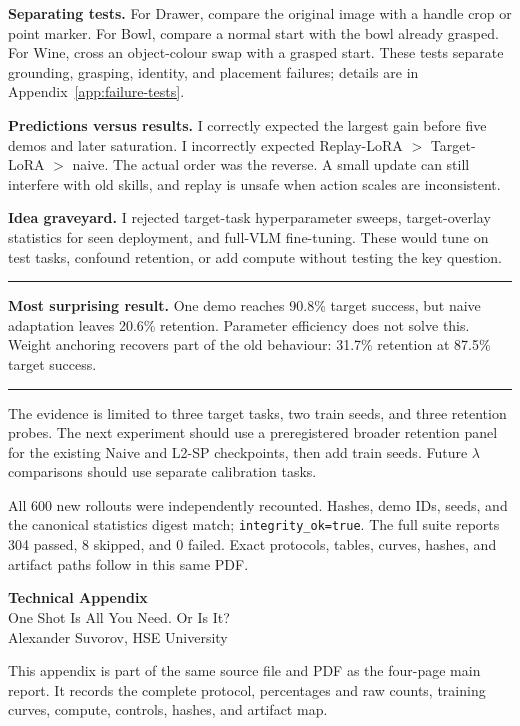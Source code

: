 \documentclass[10pt]{extarticle}
\newenvironment{finding}{\begin{center}\begin{minipage}{0.94\textwidth}\small\hrule\vspace{3pt}}{\vspace{3pt}\hrule\end{minipage}\end{center}}
\begin{document}
\textbf{Separating tests.}
For Drawer, compare the original image with a handle crop or point marker.
For Bowl, compare a normal start with the bowl already grasped. For Wine,
cross an object-colour swap with a grasped start. These tests separate
grounding, grasping, identity, and placement failures; details are in
Appendix~\ref{app:failure-tests}.

\textbf{Predictions versus results.}
I correctly expected the largest gain before five demos and later saturation.
I incorrectly expected Replay-LoRA \(>\) Target-LoRA \(>\) naive. The actual
order was the reverse. A small update can still interfere with old skills,
and replay is unsafe when action scales are inconsistent.

\textbf{Idea graveyard.}
I rejected target-task hyperparameter sweeps, target-overlay statistics for
seen deployment, and full-VLM fine-tuning. These would tune on test tasks,
confound retention, or add compute without testing the key question.
\begin{finding}
\textbf{Most surprising result.}
One demo reaches 90.8\% target success, but naive adaptation leaves 20.6\%
retention. Parameter efficiency does not solve this. Weight anchoring recovers
part of the old behaviour: 31.7\% retention at 87.5\% target success.
\end{finding}
The evidence is limited to three target tasks, two train seeds, and three
retention probes. The next experiment should use a preregistered broader
retention panel for the existing Naive and L2-SP checkpoints, then add train
seeds. Future \(\lambda\) comparisons should use separate calibration tasks.

All 600 new rollouts were independently recounted. Hashes, demo IDs, seeds,
and the canonical statistics digest match; \texttt{integrity\_ok=true}.
The full suite reports 304 passed, 8 skipped, and 0 failed. Exact protocols,
tables, curves, hashes, and artifact paths follow in this same PDF.

\clearpage
\appendix
\setcounter{section}{0}
\setcounter{figure}{0}
\setcounter{table}{0}
\renewcommand{\thefigure}{A\arabic{figure}}
\renewcommand{\thetable}{A\arabic{table}}
\renewcommand{\theHfigure}{appendix.\arabic{figure}}
\renewcommand{\theHtable}{appendix.\arabic{table}}
\renewcommand{\thepage}{A-\arabic{page}}
\setcounter{page}{1}
\begin{center}
{\fontsize{18}{21}\selectfont\bfseries Technical Appendix}\\[2pt]
{\large One Shot Is All You Need. Or Is It?}\\[4pt]
{\small Alexander Suvorov, HSE University}
\end{center}
This appendix is part of the same source file and PDF as the four-page main
report. It records the complete protocol, percentages and raw counts,
training curves, compute, controls, hashes, and artifact map.
\end{document}

